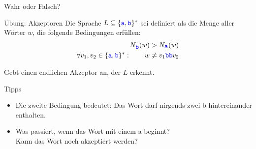\begin{frame}[t]{Wahr oder Falsch?}
	\medskip
	
\end{frame}









\begin{frame}{Übung: Akzeptoren}
	Die Sprache $L\subseteq \{\hbox{\textcolor{blue}{\texttt{a}}},\hbox{\textcolor{blue}{\texttt{b}}}\}^\ast $ sei definiert als die Menge aller Wörter $w$, die folgende Bedingungen erfüllen:
	\begin{align*}
	N_{\hbox{\textcolor{blue}{\texttt{b}}}}(w) &> N_{\hbox{\textcolor{blue}{\texttt{a}}}}(w)\\ 
	\forall v_1,v_2 \in \{\hbox{\textcolor{blue}{\texttt{a}}},\hbox{\textcolor{blue}{\texttt{b}}}\}^\ast : \qquad w &\neq v_1 \hbox{\textcolor{blue}{\texttt{bb}}} v_2 
	\end{align*}
	
	Gebt einen endlichen Akzeptor an, der $L$ erkennt. \\
	
	\bigskip
	\pause
	\begin{block}{Tipps}
		\begin{itemize}[<+->]
			\item Die zweite Bedingung bedeutet: Das Wort darf nirgends zwei \word b hintereinander enthalten.
			\item Was passiert, wenn das Wort mit einem \word a beginnt?\\
			Kann das Wort noch akzeptiert werden?
		\end{itemize}
	\end{block}
\end{frame}

